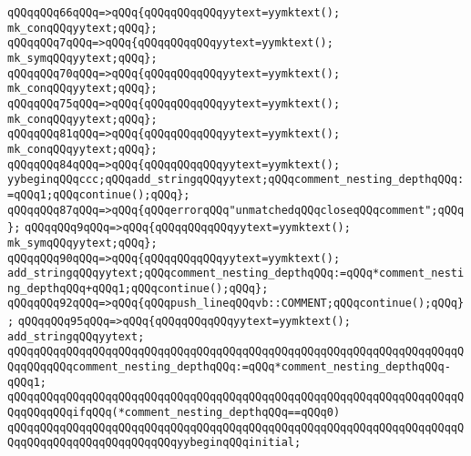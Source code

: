 \verb|qQQqqQQq66qQQq=>qQQq{qQQqqQQqqQQqyytext=yymktext();|\newline
\verb|mk_conqQQqyytext;qQQq};|\newline
\verb|qQQqqQQq7qQQq=>qQQq{qQQqqQQqqQQqyytext=yymktext();|\newline
\verb|mk_symqQQqyytext;qQQq};|\newline
\verb|qQQqqQQq70qQQq=>qQQq{qQQqqQQqqQQqyytext=yymktext();|\newline
\verb|mk_conqQQqyytext;qQQq};|\newline
\verb|qQQqqQQq75qQQq=>qQQq{qQQqqQQqqQQqyytext=yymktext();|\newline
\verb|mk_conqQQqyytext;qQQq};|\newline
\verb|qQQqqQQq81qQQq=>qQQq{qQQqqQQqqQQqyytext=yymktext();|\newline
\verb|mk_conqQQqyytext;qQQq};|\newline
\verb|qQQqqQQq84qQQq=>qQQq{qQQqqQQqqQQqyytext=yymktext();|\newline
\verb|yybeginqQQqccc;qQQqadd_stringqQQqyytext;qQQqcomment_nesting_depthqQQq:=qQQq1;qQQqcontinue();qQQq};|\newline
\verb|qQQqqQQq87qQQq=>qQQq{qQQqerrorqQQq"unmatchedqQQqcloseqQQqcomment";qQQq};|\newline
\verb|qQQqqQQq9qQQq=>qQQq{qQQqqQQqqQQqyytext=yymktext();|\newline
\verb|mk_symqQQqyytext;qQQq};|\newline
\verb|qQQqqQQq90qQQq=>qQQq{qQQqqQQqqQQqyytext=yymktext();|\newline
\verb|add_stringqQQqyytext;qQQqcomment_nesting_depthqQQq:=qQQq*comment_nesting_depthqQQq+qQQq1;qQQqcontinue();qQQq};|\newline
\verb|qQQqqQQq92qQQq=>qQQq{qQQqpush_lineqQQqvb::COMMENT;qQQqcontinue();qQQq};|\newline
\verb|qQQqqQQq95qQQq=>qQQq{qQQqqQQqqQQqyytext=yymktext();|\newline
\verb|add_stringqQQqyytext;|\newline
\verb|qQQqqQQqqQQqqQQqqQQqqQQqqQQqqQQqqQQqqQQqqQQqqQQqqQQqqQQqqQQqqQQqqQQqqQQqqQQqqQQqcomment_nesting_depthqQQq:=qQQq*comment_nesting_depthqQQq-qQQq1;|\newline
\verb|qQQqqQQqqQQqqQQqqQQqqQQqqQQqqQQqqQQqqQQqqQQqqQQqqQQqqQQqqQQqqQQqqQQqqQQqqQQqqQQqifqQQq(*comment_nesting_depthqQQq==qQQq0)|\newline
\verb|qQQqqQQqqQQqqQQqqQQqqQQqqQQqqQQqqQQqqQQqqQQqqQQqqQQqqQQqqQQqqQQqqQQqqQQqqQQqqQQqqQQqqQQqqQQqqQQqyybeginqQQqinitial;|\newline
